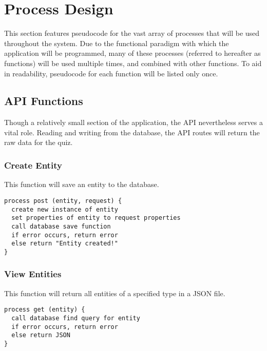 \section{Process Design}
This section features pseudocode for the vast array of processes that will be used throughout the system. Due to the functional paradigm with which the application will be programmed, many of these processes (referred to hereafter as functions) will be used multiple times, and combined with other functions. To aid in readability, pseudocode for each function will be listed only once.

\subsection{API Functions}
Though a relatively small section of the application, the API nevertheless serves a vital role. Reading and writing from the database, the API routes will return the raw data for the quiz.

\subsubsection{Create Entity}
This function will save an entity to the database.
\begin{verbatim}
process post (entity, request) {
  create new instance of entity
  set properties of entity to request properties
  call database save function
  if error occurs, return error
  else return "Entity created!"
}
\end{verbatim}

\subsubsection{View Entities}
This function will return all entities of a specified type in a JSON file.
\begin{verbatim}
process get (entity) {
  call database find query for entity
  if error occurs, return error
  else return JSON
}
\end{verbatim}
